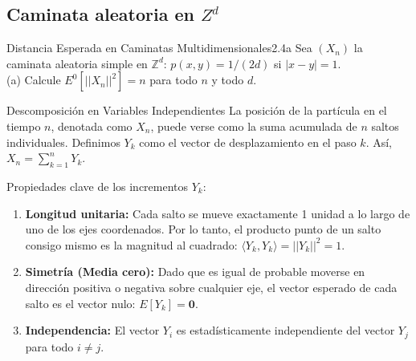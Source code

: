 \documentclass[10pt,a4paper]{article}
\begin{document}
\newpage
\subsection{Caminata aleatoria en $Z^{d}$}

\vspace{5mm}

\begin{ejercicio}{Distancia Esperada en Caminatas Multidimensionales}{2.4a}
    Sea $(X_n)$ la caminata aleatoria simple en $\mathbb{Z}^d$: $p(x, y) = 1/(2d)$ si $|x - y| = 1$. \\
    (a) Calcule $E^0[||X_n||^2] = n$ para todo $n$ y todo $d$.
\end{ejercicio}

\vspace{2mm}

\begin{nota}{Descomposición en Variables Independientes}
    La posición de la partícula en el tiempo $n$, denotada como $X_n$, puede verse como la suma acumulada de $n$ saltos individuales. 
    Definimos $Y_k$ como el vector de desplazamiento en el paso $k$. Así, $X_n = \sum_{k=1}^n Y_k$.
    
    Propiedades clave de los incrementos $Y_k$:
    \begin{enumerate}
        \item \textbf{Longitud unitaria:} Cada salto se mueve exactamente 1 unidad a lo largo de uno de los ejes coordenados. Por lo tanto, el producto punto de un salto consigo mismo es la magnitud al cuadrado: $\langle Y_k, Y_k \rangle = ||Y_k||^2 = 1$.
        \item \textbf{Simetría (Media cero):} Dado que es igual de probable moverse en dirección positiva o negativa sobre cualquier eje, el vector esperado de cada salto es el vector nulo: $E[Y_k] = \mathbf{0}$.
        \item \textbf{Independencia:} El vector $Y_i$ es estadísticamente independiente del vector $Y_j$ para todo $i \neq j$.
    \end{enumerate}
\end{nota}

\vspace{5mm}
\end{document}
